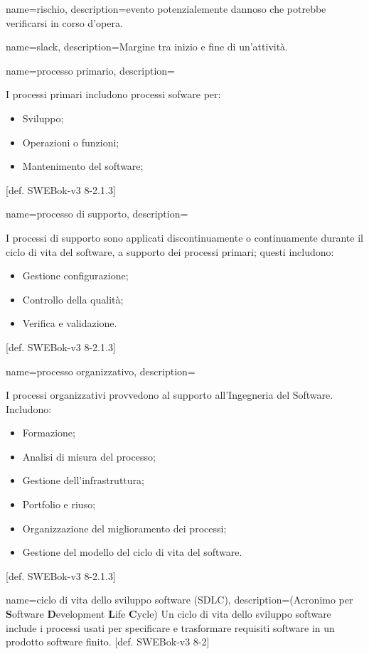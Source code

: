{
name=rischio,
description={evento potenzialemente dannoso che potrebbe verificarsi in corso d'opera.}
}

{
name=slack,
description={Margine tra inizio e fine di un'attivit\`a.}
}

{
name=processo primario,
description={I processi primari includono processi sofware per: \begin{itemize}
\item Sviluppo;
\item Operazioni o funzioni;
\item Mantenimento del software;
\end{itemize}
[def. SWEBok-v3 8-2.1.3]}
}

{
name=processo di supporto,
description={I processi di supporto sono applicati discontinuamente o continuamente durante il ciclo di vita del software, a supporto dei processi primari; questi includono:\begin{itemize}
\item Gestione configurazione;
\item Controllo della qualit\`a;
\item Verifica e validazione.
\end{itemize}
[def. SWEBok-v3 8-2.1.3]}
}

{
name=processo organizzativo,
description={I processi organizzativi provvedono al supporto all'Ingegneria del Software. Includono: \begin{itemize}
\item Formazione;
\item Analisi di misura del processo;
\item Gestione dell'infrastruttura;
\item Portfolio e riuso;
\item Organizzazione del miglioramento dei processi;
\item Gestione del modello del ciclo di vita del software.
\end{itemize}
[def. SWEBok-v3 8-2.1.3]}
}

{
name=ciclo di vita dello sviluppo software (SDLC),
description={(Acronimo per \textbf{S}oftware \textbf{D}evelopment \textbf{L}ife \textbf{C}ycle) Un ciclo di vita dello sviluppo software include i processi usati per specificare e trasformare requisiti software in un prodotto software finito. [def. SWEBok-v3 8-2]}
}

